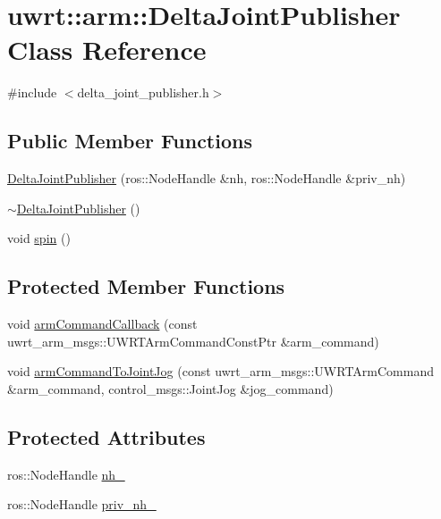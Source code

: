 \hypertarget{classuwrt_1_1arm_1_1_delta_joint_publisher}{}\section{uwrt\+:\+:arm\+:\+:Delta\+Joint\+Publisher Class Reference}
\label{classuwrt_1_1arm_1_1_delta_joint_publisher}


{\ttfamily \#include $<$delta\+\_\+joint\+\_\+publisher.\+h$>$}

\subsection*{Public Member Functions}
\begin{DoxyCompactItemize}
\item 
\hyperlink{classuwrt_1_1arm_1_1_delta_joint_publisher_a2a28037514970085647a7a83f8e41cba}{Delta\+Joint\+Publisher} (ros\+::\+Node\+Handle \&nh, ros\+::\+Node\+Handle \&priv\+\_\+nh)
\item 
\hyperlink{classuwrt_1_1arm_1_1_delta_joint_publisher_a15ad0c41ea3aa86372ed7e7f3d32d499}{$\sim$\+Delta\+Joint\+Publisher} ()
\item 
void \hyperlink{classuwrt_1_1arm_1_1_delta_joint_publisher_ae552d731968245c249fe30596ea7d1f1}{spin} ()
\end{DoxyCompactItemize}
\subsection*{Protected Member Functions}
\begin{DoxyCompactItemize}
\item 
void \hyperlink{classuwrt_1_1arm_1_1_delta_joint_publisher_abc33c0374665b4b0f630a220eb13d3b5}{arm\+Command\+Callback} (const uwrt\+\_\+arm\+\_\+msgs\+::\+U\+W\+R\+T\+Arm\+Command\+Const\+Ptr \&arm\+\_\+command)
\item 
void \hyperlink{classuwrt_1_1arm_1_1_delta_joint_publisher_a45e0f2e8e7cfdb8dc6794e63844c035a}{arm\+Command\+To\+Joint\+Jog} (const uwrt\+\_\+arm\+\_\+msgs\+::\+U\+W\+R\+T\+Arm\+Command \&arm\+\_\+command, control\+\_\+msgs\+::\+Joint\+Jog \&jog\+\_\+command)
\end{DoxyCompactItemize}
\subsection*{Protected Attributes}
\begin{DoxyCompactItemize}
\item 
ros\+::\+Node\+Handle \hyperlink{classuwrt_1_1arm_1_1_delta_joint_publisher_a6b8d05a3b56e026880a6db5eacfffcde}{nh\+\_\+}
\item 
ros\+::\+Node\+Handle \hyperlink{classuwrt_1_1arm_1_1_delta_joint_publisher_ab9cb80c9bd9410d122a19730123c3e00}{priv\+\_\+nh\+\_\+}
\end{DoxyCompactItemize}


